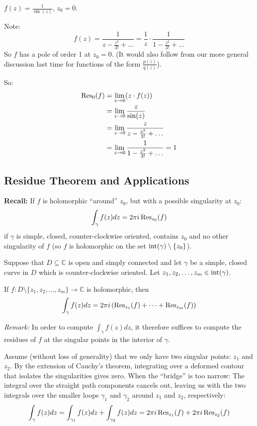 \begin{example}[Example]
$f(z) = \frac{1}{\sin(z)}$, $z_0 = 0$.

Note:
\[ f(z) = \frac{1}{z - \frac{z^3}{3!} + \dots} = \frac{1}{z} \cdot \frac{1}{1 - \frac{z^2}{3!} + \dots} \]
So $f$ has a pole of order 1 at $z_0 = 0$. (It would also follow from our more general discussion last time for functions of the form $\frac{p(z)}{q(z)}$).

So: 
\begin{align*}
\operatorname{Res}_0(f) &= \lim_{z \to 0} (z \cdot f(z)) \\
&= \lim_{z \to 0} \frac{z}{\sin(z)} \\
&= \lim_{z \to 0} \frac{z}{z - \frac{z^3}{3!} + \dots} \\
&= \lim_{z \to 0} \frac{1}{1 - \frac{z^2}{3!} + \dots} = 1
\end{align*}
\end{example}

\subsection{Residue Theorem and Applications}

\textbf{Recall:} If $f$ is holomorphic ``around'' $z_0$, but with a possible singularity at $z_0$:
\[ \int_\gamma f(z) dz = 2\pi i \operatorname{Res}_{z_0}(f) \]
if $\gamma$ is simple, closed, counter-clockwise oriented, contains $z_0$ and no other singularity of $f$ (so $f$ is holomorphic on the set $\operatorname{int}(\gamma) \setminus \{z_0\}$).

\vspace{0.3cm}

\begin{theorem}
Suppose that $D \subseteq \mathbb{C}$ is open and simply connected and let $\gamma$ be a simple, closed curve in $D$ which is counter-clockwise oriented. Let $z_1, z_2, \dots, z_m \in \operatorname{int}(\gamma)$. 

If $f: D \setminus \{z_1, z_2, \dots, z_m\} \longrightarrow \mathbb{C}$ is holomorphic, then
\[ \int_\gamma f(z) dz = 2\pi i \left(\operatorname{Res}_{z_1}(f) + \dots + \operatorname{Res}_{z_m}(f)\right) \]

\textit{Remark:} In order to compute $\int_\gamma f(z) dz$, it therefore suffices to compute the residues of $f$ at the singular points in the interior of $\gamma$.
\end{theorem}

\begin{proofbox}
Assume (without loss of generality) that we only have two singular points: $z_1$ and $z_2$. By the extension of Cauchy's theorem, integrating over a deformed contour that isolates the singularities gives zero. When the ``bridge'' is too narrow: The integral over the straight path components cancels out, leaving us with the two integrals over the smaller loops $\gamma_1$ and $\gamma_2$ around $z_1$ and $z_2$, respectively:
\[ \int_\gamma f(z) dz = \int_{\gamma_1} f(z) dz + \int_{\gamma_2} f(z) dz = 2\pi i \operatorname{Res}_{z_1}(f) + 2\pi i \operatorname{Res}_{z_2}(f) \]
\end{proofbox}

